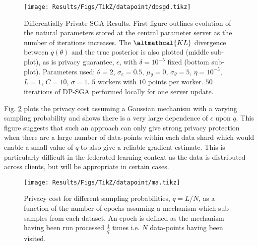 \begin{figure}
	\texttt{[image: Results/Figs/TikZ/datapoint/dpsgd.tikz]}
	\centering
	\caption{\label{fig:results-dpsgd} Differentially Private SGA Results. First figure outlines evolution of the natural parameters stored at the central parameter server as the number of iterations increases. The $\altmathcal{KL}$ divergence between $q(\theta)$ and the true posterior is also plotted (middle sub-plot), as is privacy guarantee, $\epsilon$, with $\delta = 10^{-5}$ fixed (bottom sub-plot). Parameters used: $\theta=2$, $\sigma_e=0.5$, $\mu_\theta = 0$, $\sigma_\theta = 5$, $\eta = 10^{-5}$, $L = 1$, $C=10$, $\sigma=1$. $5$ workers with $10$ points per worker. $50$ iterations of DP-SGA performed locally for one server update. }
\end{figure}

Fig. \ref{fig:results-ma} plots the privacy cost assuming a Gaussian mechanism with a varying sampling probability and shows there is a very large dependence of $\epsilon$ upon $q$. This figure suggests that such an approach can only give strong privacy protection when there are a large number of data-points within each data shard which would enable a small value of $q$ to also give a reliable gradient estimate. This is particularly difficult in the federated learning context as the data is distributed across clients, but will be appropriate in certain cases. 

\begin{figure}
	\texttt{[image: Results/Figs/TikZ/datapoint/ma.tikz]}
	\centering
	\caption{\label{fig:results-ma}  Privacy cost for different sampling probabilities, $q = L / N$, as a function of the number of epochs assuming a mechanism which sub-samples from each dataset. An epoch is defined as the mechanism having been run processed $\frac{1}{q}$ times i.e. $N$ data-points having been visited. }
\end{figure}


